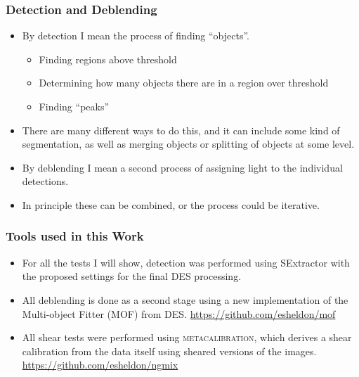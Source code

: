 \documentclass{beamer}
\newcommand{\mcal}{\textsc{metacalibration}}
\begin{document}
\frame
{
    \frametitle{Detection and Deblending}

 
    \begin{itemize}

        \item By detection I mean the process of finding ``objects''.
            \begin{itemize}
                \item Finding regions above threshold
                \item Determining how many objects there are in a region over threshold
                \item Finding ``peaks''
            \end{itemize}

        \item There are many different ways to do this, and it can include some
            kind of segmentation, as well as merging objects or splitting of
            objects at some level.

        \item By deblending I mean a second process of assigning light to the
            individual detections.

        \item In principle these can be combined, or the process could be iterative.

    \end{itemize}

}



\frame
{
    \frametitle{Tools used in this Work}

 
    \begin{itemize}

        \item For all the tests I will show, detection was performed using SExtractor
            with the proposed settings for the final DES processing.

        \item All deblending is done as a second stage using a new implementation
            of the Multi-object Fitter (MOF) from DES. \url{https://github.com/esheldon/mof}

        \item All shear tests were performed using \mcal, which derives a shear
            calibration from the data itself using sheared versions of the images.
            \url{https://github.com/esheldon/ngmix}


    \end{itemize}

}
\end{document}
